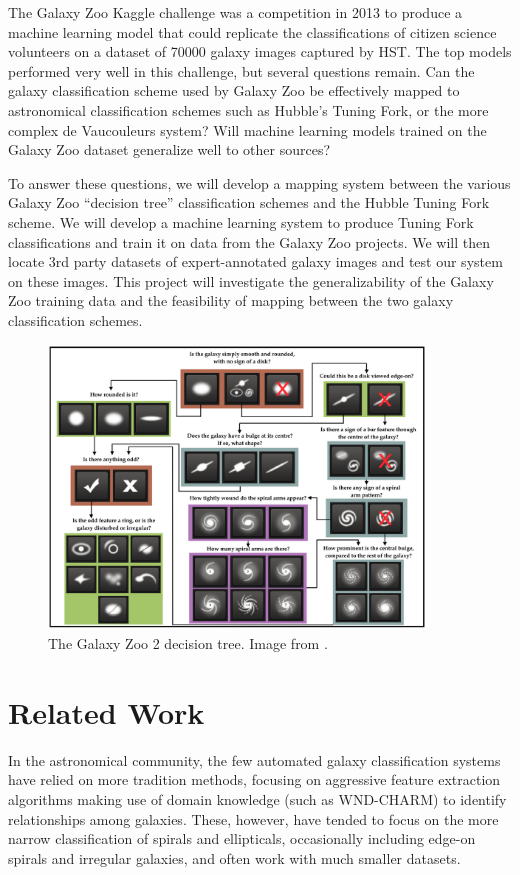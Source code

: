 \documentclass{article}
\begin{document}
The Galaxy Zoo Kaggle challenge was a competition in 2013 to produce a machine learning model that could replicate the classifications of citizen science volunteers on a dataset of 70000 galaxy images captured by HST. The top models performed very well in this challenge, but several questions remain. Can the galaxy classification scheme used by Galaxy Zoo be effectively mapped to astronomical classification schemes such as Hubble's Tuning Fork, or the more complex de Vaucouleurs system? Will machine learning models trained on the Galaxy Zoo dataset generalize well to other sources? 

To answer these questions, we will develop a mapping system between the various Galaxy Zoo “decision tree” classification schemes and the Hubble Tuning Fork scheme. We will develop a machine learning system to produce Tuning Fork classifications and train it on data from the Galaxy Zoo projects. We will then locate 3rd party datasets of expert-annotated galaxy images and test our system on these images. This project will investigate the generalizability of the Galaxy Zoo training data and the feasibility of mapping between the two galaxy classification schemes. 

\begin{figure}[h]
  \centering
	\includegraphics[width=100mm]{../img/GZ2_tree.png}
  \caption{The Galaxy Zoo 2 decision tree. Image from \cite{2013MNRAS.435.2835W}.}
\end{figure}

\section{Related Work}
\label{gen_inst}
In the astronomical community, the few automated galaxy classification systems have relied on more tradition methods, focusing on aggressive feature extraction algorithms making use of domain knowledge (such as WND-CHARM) to identify relationships among galaxies. These, however, have tended to focus on the more narrow classification of spirals and ellipticals, occasionally including edge-on spirals and irregular galaxies, and often work with much smaller datasets.
\end{document}
